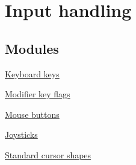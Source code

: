 \hypertarget{group__input}{}\section{Input handling}
\label{group__input}
\subsection*{Modules}
\begin{DoxyCompactItemize}
\item 
\hyperlink{group__keys}{Keyboard keys}
\item 
\hyperlink{group__mods}{Modifier key flags}
\item 
\hyperlink{group__buttons}{Mouse buttons}
\item 
\hyperlink{group__joysticks}{Joysticks}
\item 
\hyperlink{group__shapes}{Standard cursor shapes}
\end{DoxyCompactItemize}
